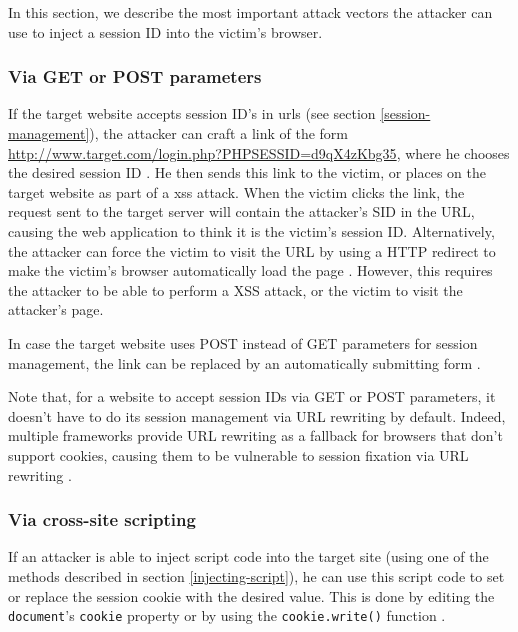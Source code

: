In this section, we describe the most important attack vectors the attacker can use to inject a session ID into the victim's browser.

\subsubsection{Via GET or POST parameters}\label{get-or-post}

If the target website accepts session ID's in \glspl{url} (see section \ref{session-management}), the attacker can craft a link of the form \url{http://www.target.com/login.php?PHPSESSID=d9qX4zKbg35}, where he chooses the desired session ID \cite{Johns2011}. He then sends this link to the victim, or places on the target website as part of a \gls{xss} attack. When the victim clicks the link, the request sent to the target server will contain the attacker's SID in the URL, causing the web application to think it is the victim's session ID. Alternatively, the attacker can force the victim to visit the URL by using a HTTP redirect \cite{rfc2616} to make the victim's browser automatically load the page \cite{Shiflett2004}. However, this requires the attacker to be able to perform a XSS attack, or the victim to visit the attacker's page.

In case the target website uses POST instead of GET parameters for session management, the link can be replaced by an automatically submitting form \cite{Kolsek2002,Bontrager2005}.

Note that, for a website to accept session IDs via GET or POST parameters, it doesn't have to do its session management via URL rewriting by default. Indeed, multiple frameworks provide URL rewriting as a fallback for browsers that don't support cookies, causing them to be vulnerable to session fixation via URL rewriting \cite{Condit2006,Holovaty2008}.

\subsubsection{Via cross-site scripting}

If an attacker is able to inject script code into the target site (using one of the methods described in section \ref{injecting-script}), he can use this script code to set or replace the \gls{session cookie} with the desired value. This is done by editing the \texttt{document}'s \texttt{cookie} property \cite{Kolsek2002} or by using the \texttt{cookie.write()} function \cite{Johns2011}.

